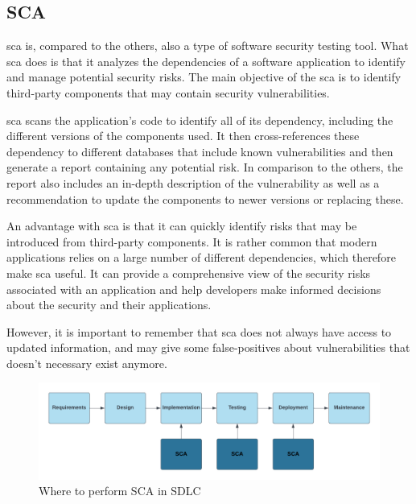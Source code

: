 \subsection{SCA}
\acrlong{sca} is, compared to the others, also a type of software security testing tool. What \acrshort{sca} does is that it analyzes the dependencies of a software application to identify and manage potential security risks. The main objective of the \acrshort{sca} is to identify third-party components that may contain security vulnerabilities. \cite{sca}

 \acrshort{sca} scans the application's code to identify all of its \gls{dependency}, including the different versions of the components used. It then cross-references these \gls{dependency} to different databases that include known vulnerabilities and then generate a report containing any potential risk. In comparison to the others, the report also includes an in-depth description of the vulnerability as well as a recommendation to update the components to newer versions or replacing these. 

An advantage with \acrshort{sca} is that it can quickly identify risks that may be introduced from third-party components. It is rather common that modern applications relies on a large number of  different dependencies, which therefore make \acrshort{sca} useful. It can provide a comprehensive view of the security risks associated with an application and help developers make informed decisions about the security and their applications. 

However, it is important to remember that \acrshort{sca} does not always have access to updated information, and may give some false-positives about vulnerabilities that doesn't necessary exist anymore. 


\begin{figure}[H]
    \centering
    \includegraphics[width=1\columnwidth]{Images/SCA.png}
    \caption{Where to perform SCA in SDLC} 
    \label{fig:Where to perform SCA in SDLC}
\end{figure}

\newpage
